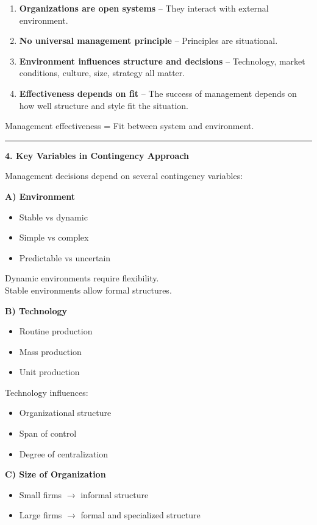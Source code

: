 \documentclass[10pt,a4paper]{article}
\newcommand{\separator}{\vspace{0.4em}\noindent\rule{\linewidth}{0.6pt}\vspace{0.4em}}
\begin{document}
\begin{enumerate}
  \item \textbf{Organizations are open systems} -- They interact with external environment.
  \item \textbf{No universal management principle} -- Principles are situational.
  \item \textbf{Environment influences structure and decisions} -- Technology, market conditions, culture, size, strategy all matter.
  \item \textbf{Effectiveness depends on fit} -- The success of management depends on how well structure and style fit the situation.
\end{enumerate}

Management effectiveness = Fit between system and environment.

\separator

\textbf{4. Key Variables in Contingency Approach}

Management decisions depend on several contingency variables:

\textbf{A) Environment}
\begin{itemize}
  \item Stable vs dynamic
  \item Simple vs complex
  \item Predictable vs uncertain
\end{itemize}

Dynamic environments require flexibility.\\
Stable environments allow formal structures.

\textbf{B) Technology}
\begin{itemize}
  \item Routine production
  \item Mass production
  \item Unit production
\end{itemize}

Technology influences:
\begin{itemize}
  \item Organizational structure
  \item Span of control
  \item Degree of centralization
\end{itemize}

\textbf{C) Size of Organization}
\begin{itemize}
  \item Small firms $\rightarrow$ informal structure
  \item Large firms $\rightarrow$ formal and specialized structure
\end{itemize}
\end{document}
